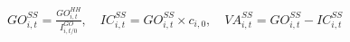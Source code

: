 \documentclass[border=4pt]{standalone}
\begin{document}
\begin{minipage}{17cm}
\centering
\Large $\displaystyle GO_{i,t}^{SS}=\frac{GO_{i,t}^{HH}}{I^{GO}_{i,t/0}},\quad IC_{i,t}^{SS}=GO_{i,t}^{SS}\times c_{i,0},\quad VA_{i,t}^{SS}=GO_{i,t}^{SS}-IC_{i,t}^{SS}$
\end{minipage}
\end{document}
